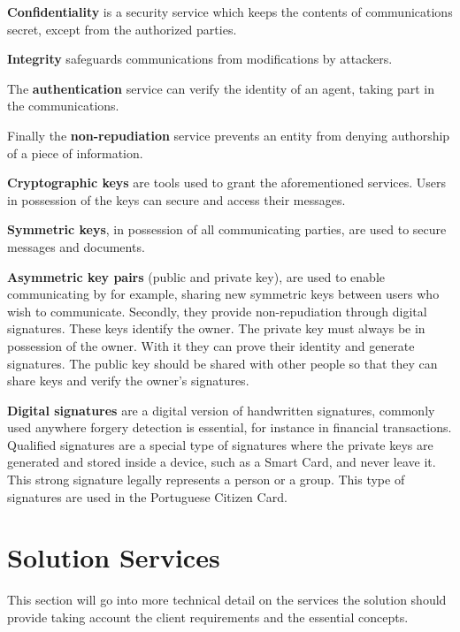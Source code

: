 \textbf{Confidentiality} is a security service which keeps the contents of communications secret, except from the authorized parties.

\textbf{Integrity} safeguards communications from modifications by attackers.

The \textbf{authentication} service can verify the identity of an agent, taking part in the communications.

Finally the \textbf{non-repudiation} service prevents an entity from denying authorship of a piece of information.

\textbf{Cryptographic keys} are tools used to grant the aforementioned services. Users in possession of the keys can secure and access their messages.

\textbf{Symmetric keys}, in possession of all communicating parties, are used to secure messages and documents.

\textbf{Asymmetric key pairs} (public and private key), are used to enable communicating by for example, sharing new symmetric keys between users who wish to communicate. Secondly, they provide non-repudiation through digital signatures.
These keys identify the owner. The private key must always be in possession of the owner. With it they can prove their identity and generate signatures.
The public key should be shared with other people so that they can share keys and verify the owner's signatures.

\textbf{Digital signatures} are a digital version of handwritten signatures, commonly used anywhere forgery detection is essential, for instance in financial transactions.
Qualified signatures are a special type of signatures where the private keys are generated and stored inside a device, such as a Smart Card, and never leave it.
This strong signature legally represents a person or a group. This type of signatures are used in the Portuguese Citizen Card.

\section{Solution Services} \label{chap:problem:services}


This section will go into more technical detail on the services the solution should provide taking account the client requirements and the essential concepts.

